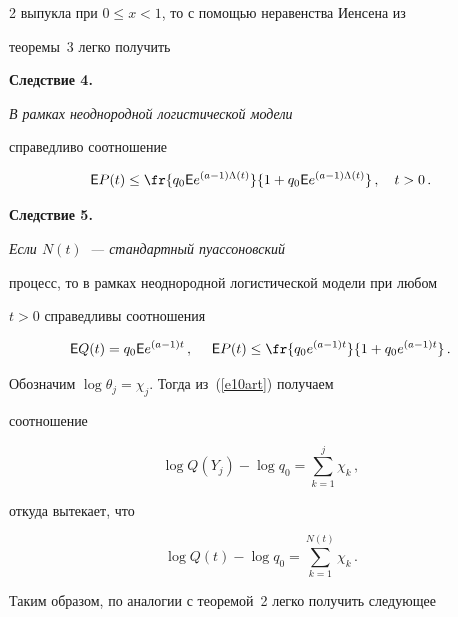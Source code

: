 \begin{multicols}{2}
выпукла при $0\le x<1$, то с помощью неравенства Иенсена из


теоремы~3 легко получить





\smallskip





\noindent


{\textbf{Следствие 4.}} {\it В рамках неоднородной логистической модели


справедливо соотношение}


$$


{\sf E}P(t)\le\fr{q_0{\sf E}e^{(a-1)\Lambda(t)}}{1+q_0{\sf


E}e^{(a-1)\Lambda(t)}}\,,\ \ \ t>0\,.


$$





\smallskip





\noindent


{\textbf{Следствие 5.}} {\it Если $N(t)$~--- стандартный пуассоновский


процесс, то в рамках неоднородной логистической модели при любом


$t>0$ справедливы соотношения}


$$


{\sf E}Q(t)=q_0{\sf E}e^{(a-1)t}\,,\ \ \ \ {\sf


E}P(t)\le\fr{q_0e^{(a-1)t}}{1+q_0e^{(a-1)t}}\,.


$$





\smallskip





Обозначим $\log \theta_j=\chi_j$. Тогда из~(\ref{e10art}) получаем


соотношение


$$


\log Q(Y_j)-\log q_0=\sum_{k=1}^{j}\chi_k\,,


$$


откуда вытекает, что


$$


\log Q(t)-\log q_0=\sum_{k=1}^{N(t)}\chi_k\,.


$$


Таким образом, по аналогии с теоремой~2 легко получить следующее



\end{multicols}
